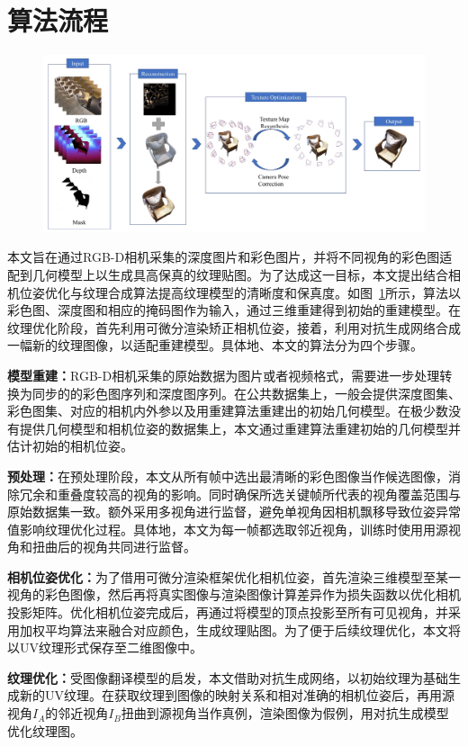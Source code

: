 \section{算法流程}
\begin{figure}[!t]
    \centering
    \includegraphics[width=1\columnwidth]{pic/work1/work1.pdf}
    \label{fig:work1}
\end{figure}

本文旨在通过RGB-D相机采集的深度图片和彩色图片，并将不同视角的彩色图适配到几何模型上以生成具高保真的纹理贴图。为了达成这一目标，本文提出结合相机位姿优化与纹理合成算法提高纹理模型的清晰度和保真度。如图~\ref{fig:work1}所示，算法以彩色图、深度图和相应的掩码图作为输入，通过三维重建得到初始的重建模型。在纹理优化阶段，首先利用可微分渲染矫正相机位姿，接着，利用对抗生成网络合成一幅新的纹理图像，以适配重建模型。具体地、本文的算法分为四个步骤。\par
\noindent\textbf{模型重建：}RGB-D相机采集的原始数据为图片或者视频格式，需要进一步处理转换为同步的的彩色图序列和深度图序列。在公共数据集上，一般会提供深度图集、彩色图集、对应的相机内外参以及用重建算法重建出的初始几何模型。在极少数没有提供几何模型和相机位姿的数据集上，本文通过重建算法重建初始的几何模型并估计初始的相机位姿。\par
\noindent\textbf{预处理：}在预处理阶段，本文从所有帧中选出最清晰的彩色图像当作候选图像，消除冗余和重叠度较高的视角的影响。同时确保所选关键帧所代表的视角覆盖范围与原始数据集一致。额外采用多视角进行监督，避免单视角因相机飘移导致位姿异常值影响纹理优化过程。具体地，本文为每一帧都选取邻近视角，训练时使用用源视角和扭曲后的视角共同进行监督。\par
\noindent\textbf{相机位姿优化：}为了借用可微分渲染框架优化相机位姿，首先渲染三维模型至某一视角的彩色图像，然后再将真实图像与渲染图像计算差异作为损失函数以优化相机投影矩阵。优化相机位姿完成后，再通过将模型的顶点投影至所有可见视角，并采用加权平均算法来融合对应颜色，生成纹理贴图。为了便于后续纹理优化，本文将以UV纹理形式保存至二维图像中。\par
\noindent\textbf{纹理优化：}受图像翻译模型的启发，本文借助对抗生成网络，以初始纹理为基础生成新的UV纹理。在获取纹理到图像的映射关系和相对准确的相机位姿后，再用源视角$I_A$的邻近视角$I_B$扭曲到源视角当作真例，渲染图像为假例，用对抗生成模型优化纹理图。\par

